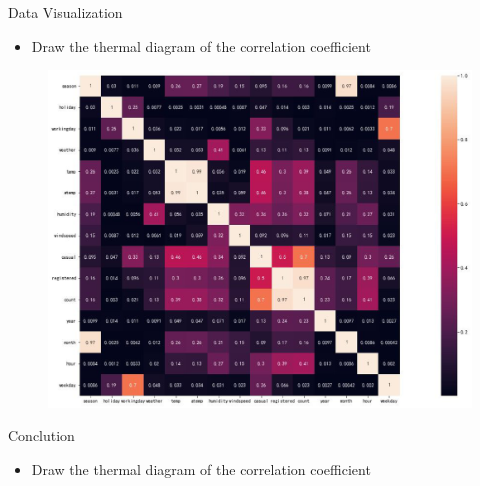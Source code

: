 \documentclass[
 size=14pt,
 paper=smartboard,  %
 mode=present, 		%
 display=slides, 	%
 style=tuliplab,  	%
 pauseslide,
 fleqn,leqno]{powerdot}
\begin{document}
\begin{slide}[toc=,bm=]{Data  Visualization}
  \begin{center}

    {
      \begin{itemize}
        
          \item Draw the thermal diagram of the correlation coefficient
      \end{itemize} 
        \begin{figure}
          \centering
          \includegraphics[height=0.5\textwidth]{pic/hot (1).eps}
          \centering
        \end{figure} 
    }
    \end{center}
 


\end{slide}
\begin{slide}[toc=,bm=]{Conclution}
  \begin{center}

    {
      \begin{itemize}
        
          \item Draw the thermal diagram of the correlation coefficient
      \end{itemize} 
        
    }
    \end{center}
 


\end{slide}
\end{document}
